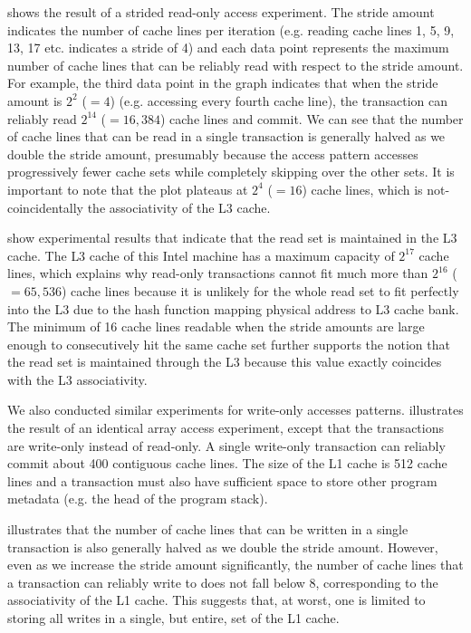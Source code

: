  shows the result of a strided read-only
access experiment. The stride amount indicates 
the number of cache lines per
iteration (e.g. reading cache lines 1, 5, 9, 13, 17 etc. 
indicates a stride of 4) and each data point 
represents the maximum number of cache
lines that can be reliably read with respect 
to the stride amount. For example,
the third data point in the graph indicates 
that when the stride amount is
$2^2$ ($=4$) (e.g. accessing every fourth cache line), 
the transaction can reliably read
$2^{14}$ ($=16,384$) cache lines and commit. 
We can see that
the number of cache lines that can be read in a 
single transaction is generally
halved as we double the stride amount, presumably 
because the access pattern
accesses progressively fewer cache sets while 
completely skipping over the other sets.
It is important to note that the plot plateaus 
at $2^4$ ($=16$) cache lines, which is not-coincidentally
the associativity of the {L3} cache.

 show experimental results that indicate
that the read set is maintained in the
{L3} cache. The {L3} cache of this Intel machine has a maximum
capacity of $2^{17}$ cache lines, which explains 
why read-only transactions
cannot fit much more than $2^{16}$ ($=65,536$) 
cache lines because it is unlikely
for the whole read set to fit perfectly into the {L3} due to
the hash function mapping physical address to L3 cache bank. 
The minimum of 16
cache lines readable when the stride amounts 
are large enough to consecutively
hit the same cache set further supports the notion that the read set is
maintained through the {L3} because this value exactly coincides 
with the L3 associativity.

We also conducted similar experiments for write-only accesses
patterns.   illustrates 
the result of an
identical array access experiment, except that the 
transactions are write-only
instead of read-only. A single write-only transaction 
can reliably commit about 400 contiguous cache lines. The
size of the {L1} cache is 512 cache lines and a transaction must also
have sufficient space to store other program metadata (e.g. the
head of the program stack). 

 illustrates that the number of cache
lines that can be written in a single transaction 
is also generally halved as we
double the stride amount.  However, even as we increase the stride amount
significantly, the number of cache lines that a 
transaction can reliably write
to does not fall below 8, corresponding to the associativity 
of the L1 cache.  This suggests that, at worst, one is limited 
to storing all writes in a single, but entire, set of the L1 cache.

